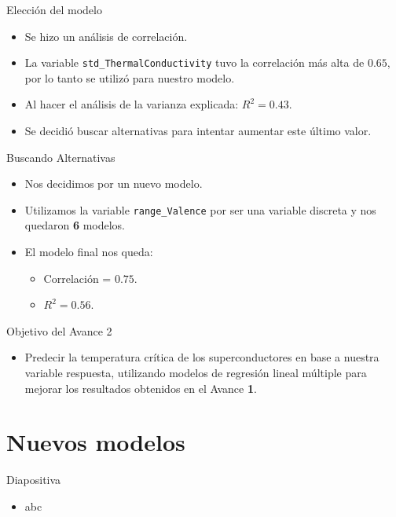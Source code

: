 \documentclass[11pt]{beamer}
\newcommand{\cod}[1]{\texttt{\frenchspacing#1}}
\begin{document}
\begin{frame}{Elección del modelo}
	\begin{itemize}
		\item Se hizo un análisis de correlación.
		\pause
		\item La variable \cod{std\_ThermalConductivity} tuvo la correlación más alta de $\mathbf{0.65}$, por lo tanto se utilizó para nuestro modelo.
		\pause
		\item Al hacer el análisis de la varianza explicada: $R^2=\mathbf{0.43}$.
		\pause
		\item Se decidió buscar alternativas para intentar aumentar este último valor.
	\end{itemize}
\end{frame}

\begin{frame}{Buscando Alternativas}
	\begin{itemize}
		\item  Nos decidimos por un nuevo modelo.
		\pause
		\item  Utilizamos la variable \cod{range\_Valence} por ser una variable discreta y nos quedaron \textbf{6} modelos.
		\pause
		\item  El modelo final nos queda:
		\begin{itemize}
			\pause
			\item  Correlación = $\mathbf{0.75}$.
			\pause
			\item  $R^2 = \mathbf{0.56}$.
		\end{itemize}
	\end{itemize}
\end{frame}

\begin{frame}{Objetivo del Avance 2}
	\begin{itemize}
		\item Predecir la temperatura crítica de los superconductores en base a nuestra variable respuesta, utilizando modelos de regresión lineal múltiple para mejorar los resultados obtenidos en el Avance \textbf{1}.
	\end{itemize}
\end{frame}


\section{Nuevos modelos}

\begin{frame}{Diapositiva}
	\begin{itemize}
		\item abc
	\end{itemize}
\end{frame}
\end{document}
